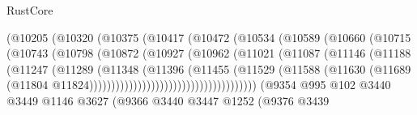 \begin{lexlean}{RustCore}
\begin{coremodule}
                                        (@10205
                                          (@10320
                                            (@10375
                                              (@10417
                                                (@10472
                                                  (@10534
                                                    (@10589
                                                      (@10660
                                                        (@10715
                                                          (@10743
                                                            (@10798
                                                              (@10872
                                                                (@10927
                                                                  (@10962
                                                                    (@11021
                                                                      (@11087
                                                                        (@11146
                                                                          (@11188
                                                                            (@11247
                                                                              (@11289
                                                                                (@11348
                                                                                  (@11396
                                                                                    (@11455
                                                                                      (@11529
                                                                                        (@11588
                                                                                          (@11630
                                                                                            (@11689
                                                                                              (@11804
                                                                                                @11824))))))))))))))))))))))))))))))))))))))
                    (@9354
                      @995
                      @102
                      @3440
                      @3449
                      @1146
                      @3627
                      (@9366
                        @3440
                        @3447
                        @1252
                        (@9376
                          @3439

\end{coremodule}
\end{lexlean}
